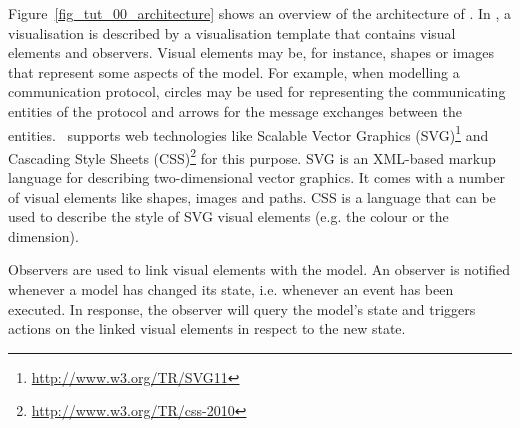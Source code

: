 Figure~\ref{fig_tut_00_architecture} shows an overview of the architecture of \bms. 
In \bms, a visualisation is described by a visualisation template that contains visual elements and observers. 
Visual elements may be, for instance, shapes or images that represent some aspects of the model. 
For example, when modelling a communication protocol, circles may be used for representing the communicating entities of the protocol and arrows for the message exchanges between the entities. 
\bms~supports web technologies like Scalable Vector Graphics (SVG)\footnote{\url{http://www.w3.org/TR/SVG11}} and Cascading Style Sheets (CSS)\footnote{\url{http://www.w3.org/TR/css-2010}} for this purpose. 
SVG is an XML-based markup language for describing two-dimensional vector graphics. 
It comes with a number of visual elements like shapes, images and paths.
CSS is a language that can be used to describe the style of SVG visual elements (e.g. the colour or the dimension). 

Observers are used to link visual elements with the model. 
An observer is notified whenever a model has changed its state, i.e. whenever an event has been executed. 
In response, the observer will query the model's state and triggers actions on the linked visual elements in respect to the new state. 

%
%
%
%
%
%
%
%

